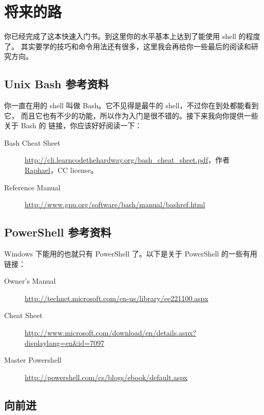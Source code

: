 \chapter{将来的路}

你已经完成了这本快速入门书。到这里你的水平基本上达到了能使用 shell 的程度了。
其实要学的技巧和命令用法还有很多，这里我会再给你一些最后的阅读和研究方向。

\section{Unix Bash 参考资料}

你一直在用的 shell 叫做 Bash。它不见得是最牛的 shell，不过你在到处都能看到它，
而且它也有不少的功能，所以作为入门是很不错的。接下来我向你提供一些关于 Bash 的
链接，你应该好好阅读一下：

\begin{description}
\item[Bash Cheat Sheet] \href{http://cli.learncodethehardway.org/bash_cheat_sheet.pdf}{http://cli.learncodethehardway.org/bash\_cheat\_sheet.pdf}，作者 \href{http://freeworld.posterous.com/65140847}{Raphael}，CC
license。
\item[Reference Manual] \href{http://www.gnu.org/software/bash/manual/bashref.html}{http://www.gnu.org/software/bash/manual/bashref.html}
\end{description}


\section{PowerShell 参考资料}

Windows 下能用的也就只有 PowerShell 了。以下是关于 PowerShell 的一些有用链接：

\begin{description}
\item[Owner's Manual] \href{http://technet.microsoft.com/en-us/library/ee221100.aspx}{http://technet.microsoft.com/en-us/library/ee221100.aspx}
\item[Cheat Sheet] \href{http://www.microsoft.com/download/en/details.aspx?displaylang=en&id=7097}{http://www.microsoft.com/download/en/details.aspx?displaylang=en\&id=7097}
\item[Master Powershell] \href{http://powershell.com/cs/blogs/ebook/default.aspx}{http://powershell.com/cs/blogs/ebook/default.aspx}
\end{description}

\section{向前进}

